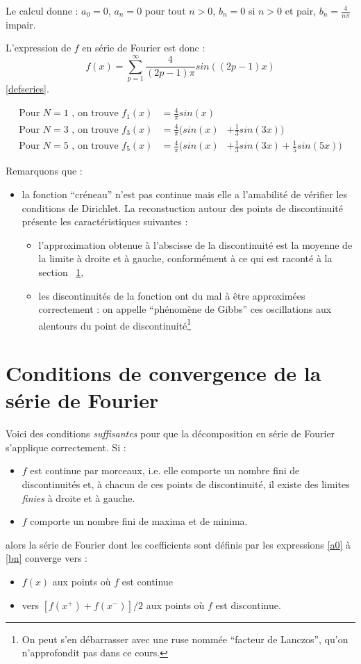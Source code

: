 Le calcul donne : $a_0=0$, $a_n=0$ pour tout $n>0$, $b_n=0$ si $n>0$ et pair, $b_n=\frac{4}{n\pi}$ impair.

L'expression de $f$ en série de Fourier est donc :
\begin{equation}
f(x)=\sum_{p=1}^\infty \frac{4}{(2p-1)\pi}sin((2p-1)x)
\end{equation}
\ref{defseries}.

\begin{eqnarray}
\text{Pour $N=1$ , on trouve } f_1(x) & =\frac{4}{\pi}sin(x) & \\
\text{Pour $N=3$ , on trouve } f_3(x) & =\frac{4}{\pi}\Big(sin(x) & +\frac{1}{3}sin(3x) \Big) \\
\text{Pour $N=5$  , on trouve } f_5(x) & =\frac{4}{\pi}\Big(sin(x)& +\frac{1}{3}sin(3x)+\frac{1}{5}sin(5x)\Big) 
\end{eqnarray}


Remarquons que :
\begin{itemize}
\item la fonction ``créneau'' n'est pas continue mais elle a l'amabilité
  de vérifier les conditions de Dirichlet. La reconstuction autour des points de discontinuité présente les caractéristiques suivantes :
\begin{itemize}
\item l'approximation obtenue à l'abscisse de la discontinuité est la
  moyenne de la limite à droite et à gauche, conformément à ce qui est
  raconté à la section ~\ref{sec_convergence},
\item les discontinuités de la fonction ont du mal à être
  approximées correctement : on appelle ``phénomène de Gibbs'' ces oscillations aux
  alentours du point de discontinuité\footnote{On peut s'en
  débarrasser avec une ruse nommée ``facteur de Lanczos'', qu'on n'approfondit pas dans ce cours.}
\end{itemize}
\end{itemize} 


\section{Conditions de convergence de la série de Fourier}
\label{sec_convergence}
Voici des conditions \emph{suffisantes} pour que la décomposition en série de
Fourier s'applique correctement. Si :
\begin{itemize}
\item $f$ est continue par morceaux, i.e. elle comporte un nombre fini
  de discontinuités et, à chacun de ces points de discontinuité, il
  existe des limites \emph{finies} à droite et à gauche.
\item $f$ comporte un nombre fini de maxima et de minima.
\end{itemize}
alors la série de Fourier dont les coefficients sont définis par les
expressions \ref{a0} à \ref{bn} converge vers :
\begin{itemize}
\item $f(x)$ aux points où $f$ est continue 
\item vers $[f(x^+)+f(x^-)]/2$ aux points où $f$ est discontinue.
\end{itemize}

